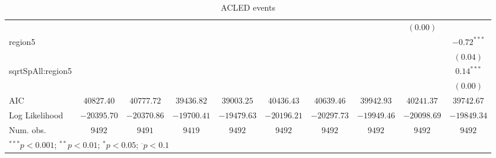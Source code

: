 \begin{sidewaystable}
\begin{center}
{\begin{tabular}{l c c c c c c c c c}
                  &               &               &               &               &               &                 &               & $(0.00)$      &               \\
region5           &               &               &               &               &               &                 &               &               & $-0.72^{***}$ \\
                  &               &               &               &               &               &                 &               &               & $(0.04)$      \\
sqrtSpAll:region5 &               &               &               &               &               &                 &               &               & $0.14^{***}$  \\
                  &               &               &               &               &               &                 &               &               & $(0.00)$      \\
\midrule
AIC               & $40827.40$    & $40777.72$    & $39436.82$    & $39003.25$    & $40436.43$    & $40639.46$      & $39942.93$    & $40241.37$    & $39742.67$    \\
Log Likelihood    & $-20395.70$   & $-20370.86$   & $-19700.41$   & $-19479.63$   & $-20196.21$   & $-20297.73$     & $-19949.46$   & $-20098.69$   & $-19849.34$   \\
Num. obs.         & $9492$        & $9491$        & $9419$        & $9492$        & $9492$        & $9492$          & $9492$        & $9492$        & $9492$        \\
\bottomrule
\multicolumn{10}{l}{\scriptsize{$^{***}p<0.001$; $^{**}p<0.01$; $^{*}p<0.05$; $^{\cdot}p<0.1$}}
\end{tabular}
}
\caption{ACLED
	       events}
\label{zacledev}
\end{center}
\end{sidewaystable}

